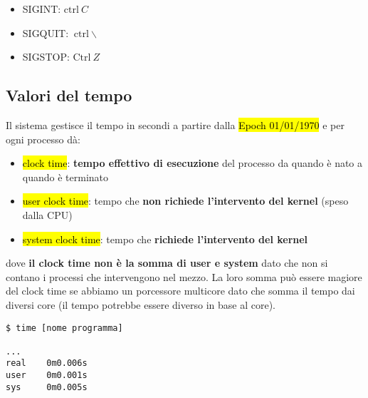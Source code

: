 \begin{itemize}
	\item SIGINT: $\text{ctrl}\ C$
	\item SIGQUIT: $\text{ctrl}\ \backslash $
	\item SIGSTOP: $\text{Ctrl}\ Z$
\end{itemize}


\subsection{Valori del tempo}

Il sistema gestisce il tempo in secondi a partire dalla \hl{Epoch 01/01/1970} e per ogni processo dà:

\begin{itemize}
	\item \hl{clock time}: \textbf{tempo effettivo di esecuzione} del processo da quando è nato a quando è terminato
	\item \hl{user clock time}: tempo che \textbf{non richiede l'intervento del kernel} (speso dalla CPU)
	\item \hl{system clock time}: tempo che \textbf{richiede l'intervento del kernel}
\end{itemize}

dove \textbf{il clock time non è la somma di user e system} dato che non si contano i processi che intervengono nel mezzo. La loro somma può essere magiore del clock time se abbiamo un porcessore multicore dato che somma il tempo dai diversi core (il tempo potrebbe essere diverso in base al core).

\begin{lstlisting}
$ time [nome programma]

...
real	0m0.006s
user	0m0.001s
sys		0m0.005s
\end{lstlisting}
